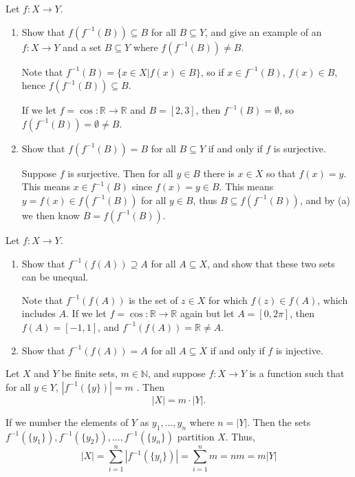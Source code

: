 \documentclass[11pt,dvipsnames]{book}
\numberwithin{figure}{section} %
\numberwithin{table}{section} %
\begin{document}
\begin{exercise}
Let $f:X\rightarrow Y$.
\begin{enumerate}[label=(\alph*)]
\item Show that $f(f^{-1}(B))\subseteq B$ for all $B\subseteq Y$, and give an example of an $f:X\rightarrow Y$ and a set $B\subseteq Y$ where $f(f^{-1}(B))\neq B$.
\begin{solution}
Note that $f^{-1}(B)=\{x\in X|f(x)\in B\}$, so if $x\in f^{-1}(B)$, $f(x)\in B$, hence $f(f^{-1}(B))\subseteq B$.

If we let $f=\cos:\mathbb{R}\rightarrow \mathbb{R}$ and $B=[2,3]$, then $f^{-1}(B)=\emptyset$, so $f(f^{-1}(B))=\emptyset\neq B$.
\end{solution}
\item Show that $f(f^{-1}(B))=B$ for all $B\subseteq Y$ if and only if $f$ is surjective.
\begin{solution}
Suppose $f$ is surjective. Then for all $y\in B$ there is $x\in X$ so that $f(x)=y$. This means $x\in f^{-1}(B)$ since $f(x)=y\in B$.  This means $y=f(x)\in f(f^{-1}(B))$ for all $y\in B$, thus $B\subseteq f(f^{-1}(B))$, and by (a) we then know $B = f(f^{-1}(B))$.
\end{solution}
\end{enumerate}
\end{exercise}

\begin{exercise}
Let $f:X\rightarrow Y$.
\begin{enumerate}[label=(\alph*)]
\item Show that $f^{-1}(f(A))\supseteq A$ for all $A\subseteq X$, and show that these two sets can be unequal.
\begin{solution}
Note that $f^{-1}(f(A))$ is the set of $z\in X$ for which $f(z)\in f(A)$, which includes $A$. If we let $f=\cos:\mathbb{R}\rightarrow \mathbb{R}$ again but let $A=[0,2\pi]$, then $f(A)=[-1,1]$, and $f^{-1}(f(A))=\mathbb{R}\neq A$.
\end{solution}
\item Show that $f^{-1}(f(A))=A$ for all $A\subseteq X$ if and only if $f$ is injective.
\end{enumerate}
\end{exercise}

\begin{exercise} Let $X$ and $Y$ be finite sets, $m\in \mathbb{N}$, and suppose $f:X\rightarrow Y$ is a function such that for all $y\in Y$, $|f^{-1}(\{y\})|=m$ . Then
\[
|X|=m\cdot |Y|.\]

\begin{solution}

If we number the elements of $Y$ as $y_{1},...,y_{n}$ where $n=|Y|$. Then the sets $f^{-1}(\{y_{1}\}),f^{-1}(\{y_{2}\}),...,f^{-1}(\{y_{n}\})$ partition $X$. Thus,
\[
|X|=\sum_{i=1}^{n}| f^{-1}(\{y_{i}\})| = \sum_{i=1}^{n}m=nm=m|Y|
\]
\end{solution}

\end{exercise}
\end{document}
